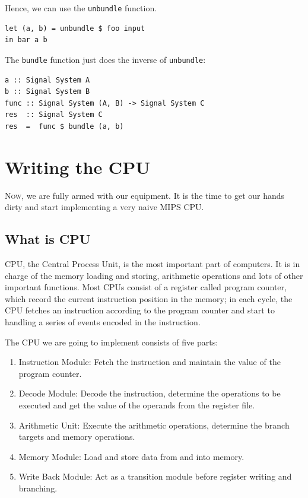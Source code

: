 \documentclass[a4paper,12pt, oneside]{book}
\begin{document}
Hence, we can use the \texttt{unbundle} function.
\begin{verbatim}
let (a, b) = unbundle $ foo input
in bar a b
\end{verbatim}
The \texttt{bundle} function just does the inverse of \texttt{unbundle}:
\begin{verbatim}
a :: Signal System A
b :: Signal System B
func :: Signal System (A, B) -> Signal System C
res  :: Signal System C
res  =  func $ bundle (a, b)
\end{verbatim}
\chapter{Writing the CPU}
\lettrine{N}{ow}, we are fully armed with our equipment. It is the time to get our hands dirty and start implementing a very naive MIPS CPU.
\section{What is CPU}
CPU, the Central Process Unit, is the most important part of computers. It is in charge of the memory loading and storing, arithmetic operations and lots of other important functions. Most CPUs consist of a register called program counter, which record the current instruction position in the memory; in each cycle, the CPU fetches an instruction according to the program counter and start to handling a series of events encoded in the instruction.

The CPU we are going to implement consists of five parts:
\begin{enumerate}
	\item Instruction Module: Fetch the instruction and maintain the value of the program counter.
	\item Decode Module: Decode the instruction, determine the operations to be executed and get the value of the operands from the register file.
	\item Arithmetic Unit: Execute the arithmetic operations, determine the branch targets and memory operations.
	\item Memory Module: Load and store data from and into memory.
	\item Write Back Module: Act as a transition module before register writing and branching. 
\end{enumerate}
\end{document}
